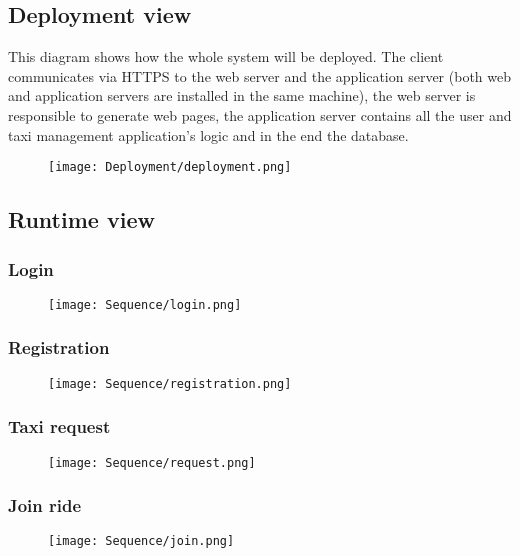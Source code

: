 \subsection{Deployment view}
This diagram shows how the whole system will be deployed.
The client communicates via HTTPS to the web server and the application server (both web and application servers are installed in the same machine), the web server is responsible to generate web pages, the application server contains all the user and taxi management application's logic and in the end the database.
	\begin{figure}[h!]
		\centering
		\texttt{[image: Deployment/deployment.png]}
	\end{figure}
	\newpage

\subsection{Runtime view}
	\subsubsection{Login}
	\begin{figure}[h!]
		\centering
		\texttt{[image: Sequence/login.png]}
	\end{figure}
	\newpage
	
	\subsubsection{Registration}
	\begin{figure}[h!]
		\centering
		\texttt{[image: Sequence/registration.png]}
	\end{figure}
	\newpage
	
	\subsubsection{Taxi request}
	\begin{figure}[h!]
		\centering
		\texttt{[image: Sequence/request.png]}
	\end{figure}
	\newpage
	
	\subsubsection{Join ride}
	\begin{figure}[h!]
		\centering
		\texttt{[image: Sequence/join.png]}
	\end{figure}
	\newpage		

